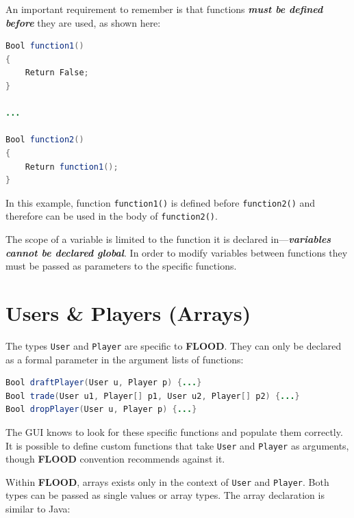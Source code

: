 \documentclass[12pt]{report}
\begin{document}
An important requirement to remember is that functions \textit{\textbf{must be defined before}} they are used, as shown here:

\begin{singlespace}
\begin{lstlisting}[language=Java,label=some-code,caption={A function must be defined before being called.}]
Bool function1()
{
	Return False;
} 

...

Bool function2()
{
	Return function1();
} 
\end{lstlisting}
\end{singlespace}

In this example, function \texttt{function1()} is defined before \texttt{function2()} and therefore can be used in the body of \texttt{function2()}. 

The scope of a variable is limited to the function it is declared in---\textit{\textbf{variables cannot be declared global}}. In order to modify variables between functions they must be passed as parameters to the specific functions.

\section{Users \& Players (Arrays)}

The types \texttt{User} and \texttt{Player} are specific to \textbf{FLOOD}. They can only be declared as a formal parameter in the argument lists of functions:

\begin{singlespace}
\begin{lstlisting}[language=Java,label=some-code,caption={\texttt{User} and \texttt{Player} declared in function argument list}]
Bool draftPlayer(User u, Player p) {...}
Bool trade(User u1, Player[] p1, User u2, Player[] p2) {...}
Bool dropPlayer(User u, Player p) {...}
\end{lstlisting}
\end{singlespace}

The GUI knows to look for these specific functions and populate them correctly. It is possible to define custom functions that take \texttt{User} and \texttt{Player} as arguments, though \textbf{FLOOD} convention recommends against it. 

Within \textbf{FLOOD}, arrays exists only in the context of \texttt{User} and \texttt{Player}. Both types can be passed as single values or array types. The array declaration is similar to Java:
\end{document}
